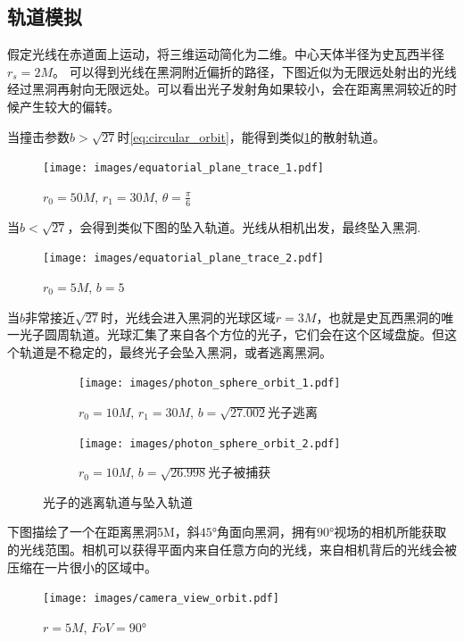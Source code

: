 \subsection{轨道模拟}
假定光线在赤道面上运动，将三维运动简化为二维。中心天体半径为史瓦西半径$r_s=2M$。
可以得到光线在黑洞附近偏折的路径，下图近似为无限远处射出的光线经过黑洞再射向无限远处。可以看出光子发射角如果较小，会在距离黑洞较近的时候产生较大的偏转。

当撞击参数$b>\sqrt{27}$时\eqref{eq:circular_orbit}，能得到类似\ref{fig:equatorial_plane_trace_1}的散射轨道。
\begin{figure}[htbp]
    \centering
    \texttt{[image: images/equatorial\_plane\_trace\_1.pdf]}
    \caption{$r_0=50M$, $r_1=30M$, $\theta=\frac{\pi}{6}$}\label{fig:equatorial_plane_trace_1} %
\end{figure}


当$b<\sqrt{27}$，会得到类似下图的坠入轨道。光线从相机出发，最终坠入黑洞.\begin{figure}[H]
    \centering
    \texttt{[image: images/equatorial\_plane\_trace\_2.pdf]}
    \caption{$r_0=5M$, $b=5$}\label{fig:equatorial_plane_trace_2} %
\end{figure}

当$b$非常接近$\sqrt{27}$时，光线会进入黑洞的光球区域$r=3M$，也就是史瓦西黑洞的唯一光子圆周轨道。光球汇集了来自各个方位的光子，它们会在这个区域盘旋。但这个轨道是不稳定的，最终光子会坠入黑洞，或者逃离黑洞。
\begin{figure}[htbp]
    \centering
    \begin{subfigure}{.5\textwidth}
        \centering
        \texttt{[image: images/photon\_sphere\_orbit\_1.pdf]}
        \caption{$r_0=10M$, $r_1=30M$, $b=\sqrt{27.002}$光子逃离}\label{dphi_1} %
    \end{subfigure}%
    \begin{subfigure}{.5\textwidth}
        \centering
        \texttt{[image: images/photon\_sphere\_orbit\_2.pdf]}
        \caption{$r_0=10M$, $b=\sqrt{26.998}$光子被捕获}\label{dphi_2} %
    \end{subfigure}
    \caption{光子的逃离轨道与坠入轨道}
\end{figure}


下图描绘了一个在距离黑洞5M，斜$\ang{45}$角面向黑洞，拥有$\ang{90}$视场的相机所能获取的光线范围。相机可以获得平面内来自任意方向的光线，来自相机背后的光线会被压缩在一片很小的区域中。
\begin{figure}[H]
    \centering
    \texttt{[image: images/camera\_view\_orbit.pdf]}
    \caption{$r=5M$, $FoV=\ang{90}$}\label{fig:camera_view_orbit} %
\end{figure}